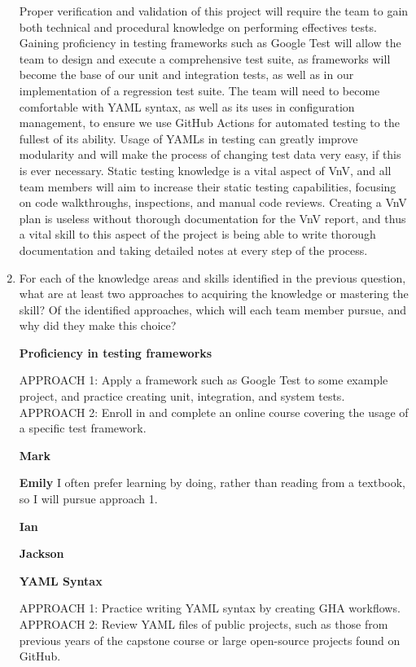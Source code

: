 \documentclass[12pt, titlepage]{article}
\begin{document}
\begin{enumerate}[leftmargin=*]
  \vspace{5pt}
  Proper verification and validation of this project will require the team to gain both technical 
  and procedural knowledge on performing effectives tests. Gaining proficiency in testing frameworks 
  such as Google Test will allow the team to design and execute a comprehensive test suite, as 
  frameworks will become the base of our unit and integration tests, as well as in our implementation 
  of a regression test suite. The team will need to become comfortable with YAML syntax, as well as 
  its uses in configuration management, to ensure we use GitHub Actions for automated testing to the 
  fullest of its ability. Usage of YAMLs in testing can greatly improve modularity and will make the 
  process of changing test data very easy, if this is ever necessary. Static testing knowledge is a 
  vital aspect of VnV, and all team members will aim to increase their static testing capabilities, 
  focusing on code walkthroughs, inspections, and manual code reviews. Creating a VnV plan is useless 
  without thorough documentation for the VnV report, and thus a vital skill to this aspect of the project 
  is being able to write thorough documentation and taking detailed notes at every step of the process.

  \item For each of the knowledge areas and skills identified in the previous
  question, what are at least two approaches to acquiring the knowledge or
  mastering the skill?  Of the identified approaches, which will each team
  member pursue, and why did they make this choice? 

  \vspace{5pt}
  \textbf{Proficiency in testing frameworks}

  APPROACH 1: Apply a framework such as Google Test to some example project, and practice creating unit, integration, and system tests. \\
  APPROACH 2: Enroll in and complete an online course covering the usage of a specific test framework.
  
  \textbf{Mark}

  \textbf{Emily} I often prefer learning by doing, rather than reading from a textbook, so I will pursue approach 1.

  \textbf{Ian}

  \textbf{Jackson}

  \vspace{10pt}
  \textbf{YAML Syntax}

  APPROACH 1: Practice writing YAML syntax by creating GHA workflows. \\
  APPROACH 2: Review YAML files of public projects, such as those from previous years of the capstone course or large open-source projects found on GitHub.
  

\end{enumerate}
\end{document}
